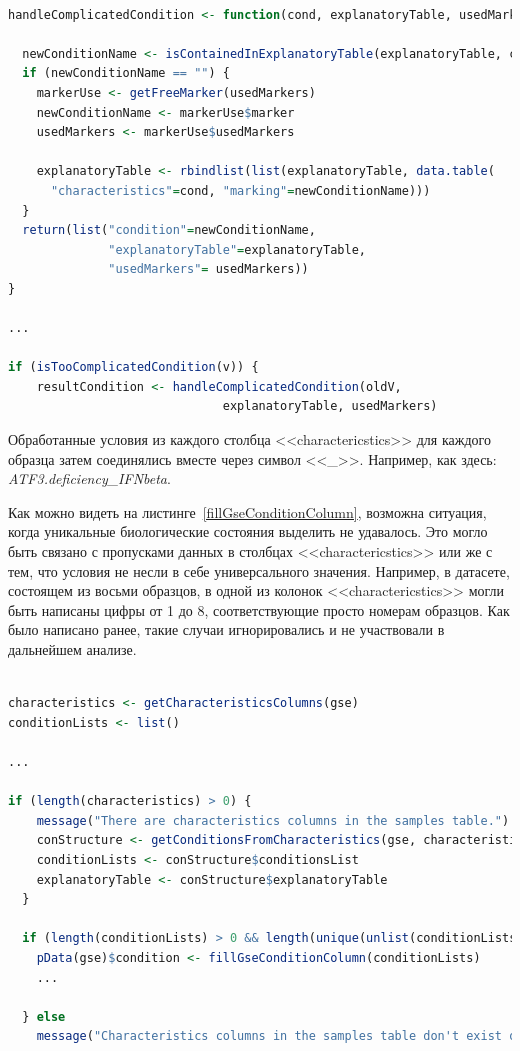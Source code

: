 \documentclass[times,specification,annotation]{itmo-student-thesis}
\begin{document}
\begin{lstlisting}[float=!h, caption={Добавление условий в explanatoryTable.}, captionpos=b, label={addConditionToExplanatoryTable}, basicstyle=\footnotesize, language=R]

handleComplicatedCondition <- function(cond, explanatoryTable, usedMarkers) {

  newConditionName <- isContainedInExplanatoryTable(explanatoryTable, cond)
  if (newConditionName == "") {
    markerUse <- getFreeMarker(usedMarkers)
    newConditionName <- markerUse$marker
    usedMarkers <- markerUse$usedMarkers
    
    explanatoryTable <- rbindlist(list(explanatoryTable, data.table(
      "characteristics"=cond, "marking"=newConditionName)))
  }
  return(list("condition"=newConditionName, 
              "explanatoryTable"=explanatoryTable,
              "usedMarkers"= usedMarkers))
}

...

if (isTooComplicatedCondition(v)) {
    resultCondition <- handleComplicatedCondition(oldV, 
                              explanatoryTable, usedMarkers)

\end{lstlisting}

Обработанные условия из каждого столбца <<charactericstics>> для каждого образца затем соединялись вместе через символ <<\_>>. Например, как здесь: \textit{ATF3.deficiency\_IFNbeta}.

Как можно видеть на листинге~\ref{fillGseConditionColumn}, возможна ситуация, когда уникальные биологические состояния выделить не удавалось. Это могло быть связано с пропусками данных в столбцах <<charactericstics>> или же с тем, что условия не несли в себе универсального значения. Например, в датасете, состоящем из восьми образцов, в одной из колонок <<charactericstics>> могли быть написаны цифры от 1 до 8, соответствующие просто номерам образцов. Как было написано ранее, такие случаи игнорировались и не участвовали в дальнейшем анализе.   

\begin{lstlisting}[float=!h, caption={Выделение условий.}, captionpos=b, label={fillGseConditionColumn}, basicstyle=\footnotesize, language=R]

characteristics <- getCharacteristicsColumns(gse)
conditionLists <- list()

...

if (length(characteristics) > 0) {
    message("There are characteristics columns in the samples table.")
    conStructure <- getConditionsFromCharacteristics(gse, characteristics)
    conditionLists <- conStructure$conditionsList
    explanatoryTable <- conStructure$explanatoryTable 
  }
  
  if (length(conditionLists) > 0 && length(unique(unlist(conditionLists))) > 1) {
    pData(gse)$condition <- fillGseConditionColumn(conditionLists) 
    ...

  } else 
    message("Characteristics columns in the samples table don't exist or were unhelpful.")

\end{lstlisting}
\end{document}

